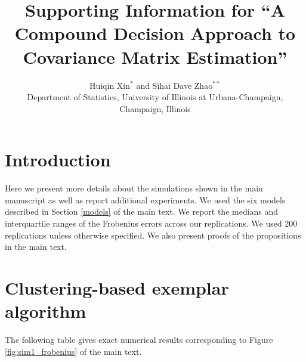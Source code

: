 \documentclass[useAMS,referee,usenatbib]{biom}
\title[Supporting Information]{Supporting Information for ``A Compound Decision Approach to Covariance Matrix Estimation''}
\author{Huiqin Xin$^{*}$\email{huiqinx2@illinois.edu } and
Sihai Dave Zhao$^{**}$\email{sdzhao@illinois.edu} \\
Department of Statistics, University of Illinois at Urbana-Champaign, Champaign, Illinois}
\begin{document}
\maketitle

\section{Introduction} 
Here we present more details about the simulations shown in the main manuscript as well as report additional experiments. We used the six models described in Section \ref{models} of the main text. We report the medians and interquartile ranges of the Frobenius errors across our replications. We used 200 replications unless otherwise specified. We also present proofs of the propositions in the main text.

\section{Clustering-based exemplar algorithm}

The following table gives exact numerical results corresponding to Figure \ref{fig:sim1_frobenius} of the main text.
\end{document}
